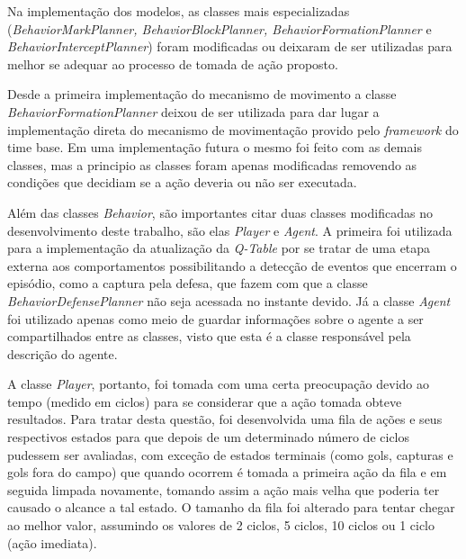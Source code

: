 
Na implementação dos modelos, as classes mais especializadas
(\textit{BehaviorMarkPlanner, BehaviorBlockPlanner, BehaviorFormationPlanner} e
\textit{BehaviorInterceptPlanner}) foram modificadas ou deixaram de ser
utilizadas para melhor se adequar ao processo de tomada de ação proposto.

Desde a primeira implementação do mecanismo de movimento a classe
\textit{BehaviorFormationPlanner} deixou de ser utilizada para dar lugar a
implementação direta do mecanismo de movimentação provido pelo
\textit{framework} do time base. Em uma implementação futura o mesmo foi feito
com as demais classes, mas a principio as classes foram apenas modificadas
removendo as condições que decidiam se a ação deveria ou não ser executada.

Além das classes \textit{Behavior}, são importantes citar duas classes
modificadas no desenvolvimento deste trabalho, são elas \textit{Player} e
\textit{Agent}. A primeira foi utilizada para a implementação da atualização da
\textit{Q-Table} por se tratar de uma etapa externa aos comportamentos
possibilitando a detecção de eventos que encerram o episódio, como a captura pela
defesa, que fazem com que a classe \textit{BehaviorDefensePlanner} não seja
acessada no instante devido. Já a classe \textit{Agent} foi utilizado apenas
como meio de guardar informações sobre o agente a ser compartilhados entre as
classes, visto que esta é a classe responsável pela descrição do agente.

A classe \textit{Player}, portanto, foi tomada com uma certa preocupação devido
ao tempo (medido em ciclos) para se considerar que a ação tomada obteve
resultados. Para tratar desta questão, foi desenvolvida uma fila de ações e seus
respectivos estados para que depois de um determinado número de ciclos pudessem
ser avaliadas, com exceção de estados terminais (como gols, capturas e gols fora
do campo) que quando ocorrem é tomada a primeira ação da fila e em seguida
limpada novamente, tomando assim a ação mais velha que poderia ter causado o
alcance a tal estado. O tamanho da fila foi alterado para tentar chegar ao
melhor valor, assumindo os valores de 2 ciclos, 5 ciclos, 10 ciclos ou 1 ciclo
(ação imediata).

